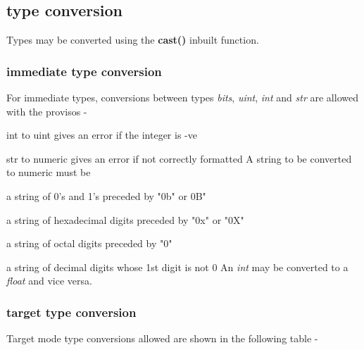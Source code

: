      



        \subsection{type conversion}

            Types may be converted using the {\bf cast()} inbuilt function.

            \subsubsection{immediate type conversion}

                For immediate types, conversions between types {\em bits}, {\em
                uint}, {\em int} and {\em str} are allowed with the provisos -
                \blist
                \item   int to uint gives an error if the integer is -ve
                \item   str to numeric gives an error if not correctly formatted
                \blend
                A string to be converted to numeric must be
                \blist
                \item   a string of 0's and 1's preceded by "0b" or 0B"
                \item   a string of hexadecimal digits preceded by "0x" or "0X"
                \item   a string of octal digits preceded by "0"
                \item   a string of decimal digits whose 1st digit is not 0
                \blend
                An {\em int} may be converted to a {\em float} and vice versa.

            \subsubsection{target type conversion}

                Target mode type conversions allowed are shown in the following
                table -

